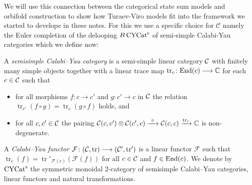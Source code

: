 We will use this connection between the categorical state sum models and orbifold construction to show how Turaev-Viro models fit into the framework we started to develope in these notes. 
For this we use a specific choice for $\mathcal{C}$ namely the Euler completion of the delooping $B\operatorname{\mathrm{CYCat}^s}$ of semi-simple Calabi-Yau categories which we define now:

\begin{definition}
	A \emph{semisimple Calabi--Yau category} is a semi-simple linear category $\mathcal{C}$ with finitely many simple objects together with a linear 
	trace map $\operatorname{tr}_c \colon \mathrm{End} (c) \longrightarrow \mathbb{C}$ for each $c\in \mathcal{C}$ such that  
	\begin{itemize}
		\item 
		for all morphisms $f\colon c \longrightarrow c'$ and $g\colon c' \longrightarrow c$ in $\mathcal{C}$ the relation $\operatorname{tr}_{c'}(f\circ g)= \operatorname{tr}_c({g\circ f})$ holds, and
		\item 
		for all $c,c'\in \mathcal{C}$ the pairing $\mathcal{C}(c,c') \otimes \mathcal{C}(c',c) \xrightarrow{\  \circ  \ } \mathcal{C}(c,c) \xrightarrow{\operatorname{tr}_c} \mathbb{C}$ is non-degenerate. 
	\end{itemize}
	A \emph{Calabi--Yau functor} $\mathcal{F} \colon (\mathcal{C}, \operatorname{tr}) \longrightarrow (\mathcal{C}' , \operatorname{tr}')$ is a linear functor $\mathcal{F}$ such that $\operatorname{tr}_c(f)= \operatorname{tr}'_{\mathcal{F}(c)}(\mathcal{F}(f)) $ for all $c\in \mathcal{C}$ and $f\in \mathrm{End}(c)$. We denote by 
	$\operatorname{\mathrm{CYCat}^s}$ the symmetric monoidal 2-category of semisimple Calabi--Yau categories, linear functors and natural transformations.
\end{definition} 

